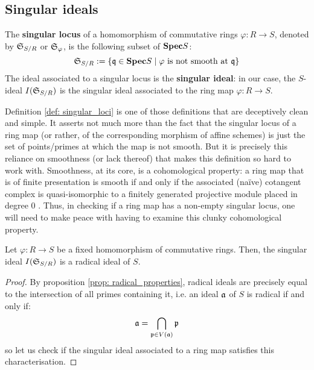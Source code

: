             \subsection{Singular ideals}
                \begin{definition} \label{def: singular_loci}
                    The \textbf{singular locus} of a homomorphism of commutative rings $\varphi: R \to S$, denoted by $\mathfrak{S}_{S/R}$ or $\mathfrak{S}_{\varphi}$, is the following subset of $\mathbf{Spec} S$:
                        $$\mathfrak{S}_{S/R} := \{\mathfrak{q} \in \mathbf{Spec} S \mid \text{$\varphi$ is not smooth at $\mathfrak{q}$}\}$$
                    The ideal associated to a singular locus is the \textbf{singular ideal}: in our case, the $S$-ideal $I(\mathfrak{S}_{S/R})$ is the singular ideal associated to the ring map $\varphi: R \to S$.
                \end{definition}
                \begin{remark}
                    Definition \ref{def: singular_loci} is one of those definitions that are deceptively clean and simple. It asserts not much more than the fact that the singular locus of a ring map (or rather, of the corresponding morphism of affine schemes) is just the set of points/primes at which the map is not smooth. But it is precisely this reliance on smoothness (or lack thereof) that makes this definition so hard to work with. Smoothness, at its core, is a cohomological property: a ring map that is of finite presentation is smooth if and only if the associated (na\"ive) cotangent complex is quasi-isomorphic to a finitely generated projective module placed in degree $0$ \cite[\href{https://stacks.math.columbia.edu/tag/00T2}{Tag 00T2}]{stacks}. Thus, in checking if a ring map has a non-empty singular locus, one will need to make peace with having to examine this clunky cohomological property.  
                \end{remark}
                
                \begin{proposition}
                    Let $\varphi: R \to S$ be a fixed homomorphism of commutative rings. Then, the singular ideal $I(\mathfrak{S}_{S/R})$ is a radical ideal of $S$.
                \end{proposition}
                    \begin{proof}
                        By proposition \ref{prop: radical_properties}, radical ideals are precisely equal to the intersection of all primes containing it, i.e. an ideal $\mathfrak{a}$ of $S$ is radical if and only if:
                            $$\mathfrak{a} = \bigcap_{\mathfrak{p} \in V(\mathfrak{a})} \mathfrak{p}$$
                        so let us check if the singular ideal associated to a ring map satisfies this characterisation. 
                    \end{proof}
    
